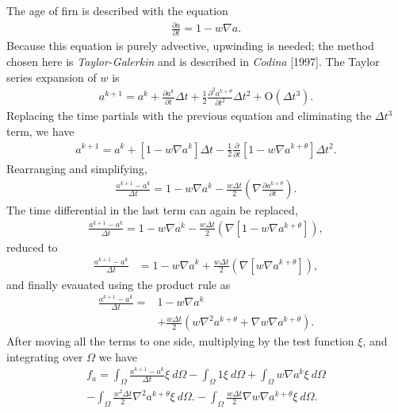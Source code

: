 \documentclass{article}%
\begin{document}
The age of firn is described with the equation
\begin{align*}
  \frac{\partial a}{\partial t} = 1 - w \nabla{a}.
\end{align*}
Because this equation is purely advective, upwinding is needed; the method chosen here is \emph{Taylor-Galerkin} and is described in \emph{Codina} [1997].  The Taylor series expansion of $w$ is
\begin{align*}
  a^{k+1} = a^{k} + \frac{\partial a^k}{\partial t}\Delta t + 
            \frac{1}{2}\frac{\partial^2 a^{k+\theta}}{\partial t^2}\Delta t^2 + 
            \mathrm{O} (\Delta t^3).
\end{align*}
Replacing the time partials with the previous equation and eliminating the $\Delta t^3$ term, we have
\begin{align*}
  a^{k+1} = a^{k} + \left[1 - w \nabla{a}^k \right] \Delta t
            - \frac{1}{2}\frac{\partial}{\partial t}
              \left[1 - w \nabla{a}^{k+\theta} \right] \Delta t^2. 
\end{align*}
Rearranging and simplifying,
\begin{align*}
  \frac{a^{k+1} - a^{k}}{\Delta t} = 1 - w \nabla{a}^k
        - \frac{w \Delta t}{2} 
          \left( \nabla \frac{\partial a^{k+\theta}}{\partial t} \right).
\end{align*}
The time differential in the last term can again be replaced, 
\begin{align*}
  \frac{a^{k+1} - a^{k}}{\Delta t} = 1 - w \nabla{a}^k
        - \frac{w \Delta t}{2} 
          \left( \nabla [1 - w \nabla a^{k+\theta}] \right),
\end{align*}
reduced to
\begin{align*}
  \frac{a^{k+1} - a^{k}}{\Delta t} &= 1 - w \nabla{a}^k
        + \frac{w \Delta t}{2} 
          \left( \nabla [w \nabla a^{k+\theta}] \right),
\end{align*}
and finally evauated using the product rule as
\begin{align*}
  \frac{a^{k+1} - a^{k}}{\Delta t} = &1 - w \nabla{a}^k\\
        &+ \frac{w \Delta t}{2} 
          \left( w \nabla^2 a^{k+\theta} + \nabla w \nabla a^{k+\theta} \right).
\end{align*}
After moving all the terms to one side, multiplying by the test function $\xi$, and integrating over $\Omega$ we have
\begin{align*}
  f_a = \int_{\Omega} \frac{a^{k+1} - a^{k}}{\Delta t}\xi\ d\Omega - 
      \int_{\Omega} 1\xi\ d\Omega
  + \int_{\Omega} w \nabla{a}^k \xi\ d\Omega \\
  - \int_{\Omega} \frac{w^2 \Delta t}{2} 
    \nabla^2 a^{k+\theta} \xi\ d\Omega.
  - \int_{\Omega} \frac{w \Delta t}{2} 
    \nabla w \nabla a^{k+\theta} \xi\ d\Omega.
\end{align*}
\end{document}
